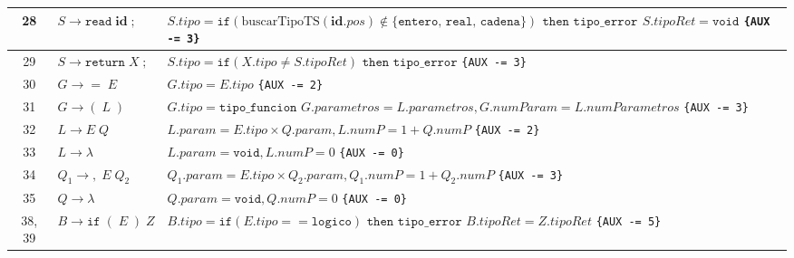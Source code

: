 \documentclass{article}
\begin{document}
\begin{longtable}{|c|>{\raggedright\arraybackslash}p{5.5cm}|>{\raggedright\arraybackslash}p{10cm}|}
28 & $S \to \texttt{read} \; \mathbf{id} \; ;$ & 
$S.tipo = \texttt{if}(\text{buscarTipoTS}(\mathbf{id}.pos) \notin \{\texttt{entero, real, cadena}\})$ \newline
\hspace*{0.5cm} $\texttt{then tipo\_error}$ \newline
$S.tipoRet = \texttt{void}$ \newline
\texttt{\{AUX -= 3\}} \\ \hline

29 & $S \to \texttt{return} \; X \; ;$ & 
$S.tipo = \texttt{if}(X.tipo \neq S.tipoRet) \texttt{ then tipo\_error}$ \newline
\texttt{\{AUX -= 3\}} \\ \hline

30 & $G \to = \; E$ & 
$G.tipo = E.tipo$ \newline
\texttt{\{AUX -= 2\}} \\ \hline

31 & $G \to ( \; L \; )$ & 
$G.tipo = \texttt{tipo\_funcion}$ \newline
$G.parametros = L.parametros, G.numParam = L.numParametros$ \newline
\texttt{\{AUX -= 3\}} \\ \hline

32 & $L \to E \; Q$ & $L.param = E.tipo \times Q.param, L.numP = 1 + Q.numP$ \newline \texttt{\{AUX -= 2\}} \\ \hline
33 & $L \to \lambda$ & $L.param = \texttt{void}, L.numP = 0$ \hspace{1cm} \texttt{\{AUX -= 0\}} \\ \hline
34 & $Q_1 \to , \; E \; Q_2$ & $Q_1.param = E.tipo \times Q_2.param, Q_1.numP = 1 + Q_2.numP$ \newline \texttt{\{AUX -= 3\}} \\ \hline
35 & $Q \to \lambda$ & $Q.param = \texttt{void}, Q.numP = 0$ \hspace{1cm} \texttt{\{AUX -= 0\}} \\ \hline

38, 39 & $B \to \texttt{if} \; ( \; E \; ) \; Z$ & 
$B.tipo = \texttt{if}(E.tipo == \texttt{logico}) \texttt{ then tipo\_error}$ \newline
$B.tipoRet = Z.tipoRet$ \newline
\texttt{\{AUX -= 5\}} \\ \hline


\end{longtable}
\end{document}
